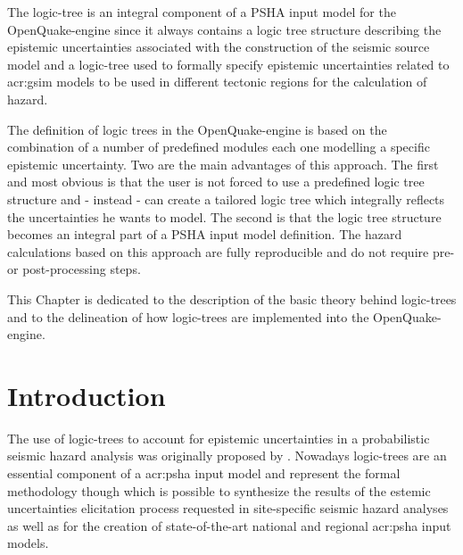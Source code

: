 %
The logic-tree is an integral component of a PSHA input model for the 
OpenQuake-engine since it always contains a logic tree structure 
describing the epistemic uncertainties associated with the construction 
of the seismic source model and a logic-tree used to formally specify 
epistemic uncertainties related to \gls{acr:gsim} models to be used in 
different tectonic regions for the calculation of hazard.

The definition of logic trees in the OpenQuake-engine is based on
the combination of a number of predefined modules each one modelling a 
specific epistemic uncertainty. 
%
Two are the main advantages of this approach. The first and most obvious  
is that the user is not forced to use a predefined logic tree structure and
- instead - can create a tailored logic tree which integrally 
reflects the uncertainties he wants to model. 
%
The second is that the logic tree structure becomes an integral part of  
a PSHA input model definition. The hazard calculations based on this approach
are fully reproducible and do not require pre- or post-processing steps.

This Chapter is dedicated to the description of the basic theory behind 
logic-trees and to the delineation of how logic-trees are implemented 
into the OpenQuake-engine.
%
\section{Introduction}
The use of logic-trees to account for epistemic uncertainties in a 
probabilistic seismic hazard analysis was originally proposed by 
\textcite{kulkarni84}.
%
Nowadays logic-trees are an essential component of a \gls{acr:psha} input
model and represent the formal methodology though which is possible to 
synthesize the results of the estemic uncertainties elicitation process
requested in site-specific seismic hazard analyses \parencite{budnitz1997}
as well as for the creation of state\--of\--the\--art national and 
regional \gls{acr:psha} input models. 


